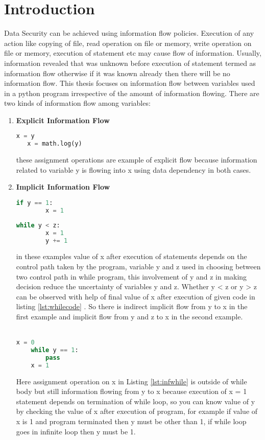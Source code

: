 \chapter{Introduction}
Data Security can be achieved using information flow policies. Execution of any action
like copying of file, read operation on file or memory, write operation on file or memory, execution of statement etc may cause flow of information. Usually, information revealed that was
unknown before execution of statement termed as information flow otherwise if it was known already then there will be no information flow. This thesis focuses on information flow between
variables used in a python program irrespective of the amount of information flowing. There are two kinds of information flow among variables:\\
\begin{enumerate}
	\item{\textbf{Explicit Information Flow}}\\
   \begin{lstlisting}[language=Python, caption=Python example]
   x = y
   x = math.log(y)\end{lstlisting}
	these assignment operations are example of explicit flow because information related to variable y is flowing into x using data dependency in both cases.
	\item{\textbf{Implicit Information Flow}}\\
	\begin{lstlisting}[language=Python, caption=Python example]
	if y == 1:
		x = 1
	\end{lstlisting}
	\pagebreak
	\begin{lstlisting}[language=Python, caption=Python example, label=lst:whilecode]
	while y < z:
		x = 1
		y += 1\end{lstlisting}
	in these examples value of x after execution of statements depends on the control path
	taken by the program, variable y and z used in choosing between two control path in while
	program, this involvement of y and z in making decision reduce the uncertainty of variables
	y and z. Whether y < z or y > z can be observed with help of final value of x after execution of given code in listing \ref{lst:whilecode} . So there is indirect implicit flow from y to x in the first example and implicit flow from y
	and z to x in the second example\cite{denning}.\\~\\
	\begin{lstlisting}[language=Python, caption=Python example, label=lst:infwhile]
	x = 0
	while y == 1:
		pass
	x = 1\end{lstlisting}
   Here assignment operation on x in Listing \ref{lst:infwhile} is outside of while body but still information flowing from y to x because execution of x = 1 statement depends on termination of while loop, so you can know value of y by checking the value of x after execution of program, for example if value of x is 1 and program terminated then y must be other than 1, if while loop goes in infinite loop then y must be 1.
   

\end{enumerate}
